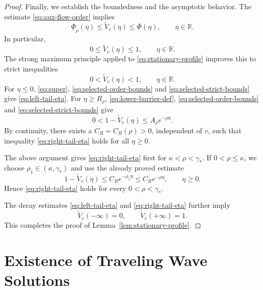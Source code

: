 \documentclass[preprint,sort&compress,final,12pt]{elsarticle}
\numberwithin{equation}{section}
\begin{document}
\begin{proof}
Finally, we establish the boundedness and the asymptotic behavior. The estimate \eqref{eq:aux-flow-order} implies
\begin{equation}\label{eq:selected-order-bounds}
\underline\Phi_\rho(\eta) \le
\widetilde V_v(\eta) \le
\overline\Phi(\eta), \qquad \eta\in\mathbb R.
\end{equation}
In particular,
\begin{equation*}
0\le \widetilde V_v(\eta)\le1,
\qquad \eta\in\mathbb R.
\end{equation*}
The strong maximum principle applied to \eqref{eq:stationary-profile} improves this to strict inequalities
\begin{equation}\label{eq:selected-strict-bounds}
0<\widetilde V_v(\eta)<1,
\qquad \eta\in\mathbb R.
\end{equation}
For $\eta\le0$, \eqref{eq:super}, \eqref{eq:selected-order-bounds} and \eqref{eq:selected-strict-bounds} give \eqref{eq:left-tail-eta}.
For $\eta\ge R_\rho$, \eqref{eq:lower-barrier-def}, \eqref{eq:selected-order-bounds} and \eqref{eq:selected-strict-bounds} give
\begin{equation*}
0<1-\widetilde V_v(\eta) \le A_\rho e^{-\rho\eta}.
\end{equation*}
By continuity, there exists a $C_R=C_R(\rho)>0$, independent of $v$, such that inequality \eqref{eq:right-tail-eta} holds for all $\eta\ge0$.


The above argument gives \eqref{eq:right-tail-eta} first for $\kappa<\rho<\gamma_*$. If $0<\rho\le\kappa$, we choose $\rho_1\in(\kappa,\gamma_*)$ and use the already proved estimate
\begin{equation*}
1-\widetilde V_v(\eta)\le C_Re^{-\rho_1\eta}\le C_Re^{-\rho\eta},
\qquad \eta\ge0.
\end{equation*}
Hence \eqref{eq:right-tail-eta} holds for every $0<\rho<\gamma_*$.


The decay estimates \eqref{eq:left-tail-eta} and \eqref{eq:right-tail-eta} further imply
\begin{equation*}
\widetilde V_v(-\infty)=0, \qquad \widetilde V_v(+\infty)=1.
\end{equation*}
This completes the proof of Lemma~\ref {lem:stationary-profile}.
\end{proof}


\section{Existence of Traveling Wave Solutions}\label{sec:existence}
\end{document}
